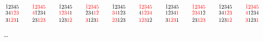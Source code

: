 \documentclass{article}
\begin{document}
\[
\SeqCompare{\dot{1}2345}{\SeqCompare{34\textcolor{red}{1}\textcolor{red}{\dot{2}}\textcolor{red}{3}}{3\textcolor{red}{1}\textcolor{red}{\dot{2}}\textcolor{red}{3}1}}
\qquad
\SeqCompare{\textcolor{red}{\dot{1}}\textcolor{red}{2}\textcolor{red}{3}\textcolor{red}{4}\textcolor{red}{5}}{\SeqCompare{\textcolor{red}{4}1\dot{2}34}{\dot{2}3\textcolor{red}{1}\textcolor{red}{\dot{2}}\textcolor{red}{3}}}
\qquad
\SeqCompare{\dot{1}2345}{\SeqCompare{\textcolor{red}{1}\textcolor{red}{\dot{2}}\textcolor{red}{3}\textcolor{red}{4}1}{1\dot{2}3\textcolor{red}{1}\textcolor{red}{\dot{2}}}}
\qquad
\SeqCompare{\textcolor{red}{\dot{1}}\textcolor{red}{2}\textcolor{red}{3}\textcolor{red}{4}\textcolor{red}{5}}{\SeqCompare{\dot{2}34\textcolor{red}{1}\textcolor{red}{\dot{2}}}{\textcolor{red}{3}1\dot{2}3\textcolor{red}{1}}}
\qquad
\SeqCompare{\dot{1}2345}{\SeqCompare{\textcolor{red}{3}\textcolor{red}{4}1\dot{2}3}{\textcolor{red}{\dot{2}}\textcolor{red}{3}1\dot{2}3}}
\qquad
\SeqCompare{\textcolor{red}{\dot{1}}\textcolor{red}{2}\textcolor{red}{3}\textcolor{red}{4}\textcolor{red}{5}}{\SeqCompare{4\textcolor{red}{1}\textcolor{red}{\dot{2}}\textcolor{red}{3}\textcolor{red}{4}}{\textcolor{red}{1}\textcolor{red}{\dot{2}}\textcolor{red}{3}1\dot{2}}}
\qquad
\SeqCompare{\dot{1}2345}{\SeqCompare{1\dot{2}34\textcolor{red}{1}}{3\textcolor{red}{1}\textcolor{red}{\dot{2}}\textcolor{red}{3}1}}
\qquad
\SeqCompare{\textcolor{red}{\dot{1}}\textcolor{red}{2}\textcolor{red}{3}\textcolor{red}{4}\textcolor{red}{5}}{\SeqCompare{\textcolor{red}{\dot{2}}\textcolor{red}{3}\textcolor{red}{4}1\dot{2}}{\dot{2}3\textcolor{red}{1}\textcolor{red}{\dot{2}}\textcolor{red}{3}}}
\qquad
\SeqCompare{\dot{1}2345}{\SeqCompare{34\textcolor{red}{1}\textcolor{red}{\dot{2}}\textcolor{red}{3}}{1\dot{2}3\textcolor{red}{1}\textcolor{red}{\dot{2}}}}
\qquad
\SeqCompare{\textcolor{red}{\dot{1}}\textcolor{red}{2}\textcolor{red}{3}\textcolor{red}{4}\textcolor{red}{5}}{\SeqCompare{\textcolor{red}{4}1\dot{2}34}{\textcolor{red}{3}1\dot{2}3\textcolor{red}{1}}}
\]

\dots


% 

\end{document}
